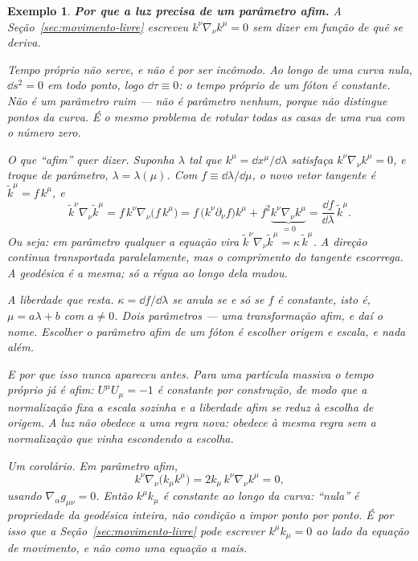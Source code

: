 \documentclass[12pt,a4paper,oneside]{book}
\theoremstyle{rgplain}
\newtheorem{example}{Exemplo}[chapter]
\theoremstyle{rgremark}
\begin{document}
\begin{example}
\textbf{Por que a luz precisa de um parâmetro afim.} A
Seção~\ref{sec:movimento-livre} escreveu $k^\nu\nabla_\nu k^\mu=0$ sem dizer em
função de quê se deriva.

\emph{Tempo próprio não serve, e não é por ser incômodo.} Ao longo de uma curva
nula, $\dd s^2=0$ em todo ponto, logo $\dd\tau\equiv0$: o tempo próprio de um
fóton é \emph{constante}. Não é um
parâmetro ruim --- não é parâmetro nenhum, porque não distingue pontos da
curva. É o mesmo problema de rotular todas as casas de uma rua com o número
zero.

\emph{O que ``afim'' quer dizer.} Suponha $\lambda$ tal que
$k^\mu=\dd x^\mu/\dd\lambda$ satisfaça $k^\nu\nabla_\nu k^\mu=0$, e troque de
parâmetro, $\lambda=\lambda(\mu)$. Com $f\equiv\dd\lambda/\dd\mu$, o novo vetor
tangente é $\tilde k^\mu=f\,k^\mu$, e
\[
  \tilde k^\nu\nabla_\nu\tilde k^\mu
  =f\,k^\nu\nabla_\nu\bigl(f\,k^\mu\bigr)
  =f\,\bigl(k^\nu\partial_\nu f\bigr)k^\mu
   +f^2\underbrace{k^\nu\nabla_\nu k^\mu}_{=0}
  =\frac{\dd f}{\dd\lambda}\,\tilde k^\mu .
\]
Ou seja: em parâmetro qualquer a equação vira
$\tilde k^\nu\nabla_\nu\tilde k^\mu=\kappa\,\tilde k^\mu$. A \emph{direção}
continua transportada paralelamente, mas o \emph{comprimento} do tangente
escorrega. A geodésica é a mesma; só
a régua ao longo dela mudou.

\emph{A liberdade que resta.} $\kappa=\dd f/\dd\lambda$ se anula se e
só se $f$ é constante, isto é, $\mu=a\lambda+b$ com $a\ne0$. Dois parâmetros ---
uma transformação afim, e daí o nome. Escolher o
parâmetro afim de um fóton é escolher origem e escala, e nada além.

\emph{E por que isso nunca apareceu antes.} Para uma partícula massiva o tempo
próprio \emph{já é} afim: $U^\mu U_\mu=-1$ é constante por construção, de modo
que a normalização fixa a escala sozinha e a liberdade afim se reduz à escolha
de origem. A luz não obedece a uma regra nova: obedece à mesma regra sem a
normalização que vinha escondendo a escolha.

\emph{Um corolário.} Em parâmetro afim,
\[
  k^\nu\nabla_\nu\bigl(k_\mu k^\mu\bigr)
  =2k_\mu\,k^\nu\nabla_\nu k^\mu=0 ,
\]
usando $\nabla_\alpha g_{\mu\nu}=0$. Então $k^\mu k_\mu$ é constante ao longo
da curva: ``nula'' é propriedade da geodésica inteira, não condição a impor
ponto por ponto. É por isso que a Seção~\ref{sec:movimento-livre} pode escrever
$k^\mu k_\mu=0$ ao lado da equação de movimento, e não como uma equação a mais.
\end{example}
\end{document}
